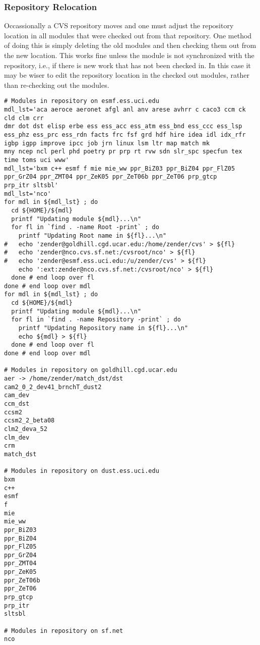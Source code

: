 \documentclass[12pt,twoside]{article}
\begin{document}
\subsubsection{Repository Relocation}\label{sxn:rlc}
Occassionally a CVS repository moves and one must adjust the
 repository location in all modules that were checked out from that
 repository. 
One method of doing this is simply deleting the old modules and then
 checking them out from the new location.
This works fine unless the module is not synchronized with the
 repository, i.e., if there is new work that has not been checked in. 
In this case it may be wiser to edit the repository location in the 
checked out modules, rather than re-checking out the modules.
\begin{verbatim}
# Modules in repository on esmf.ess.uci.edu 
mdl_lst='aca aeroce aeronet afgl anl anv arese avhrr c caco3 ccm ck cld clm crr
dmr dot dst elisp erbe ess ess_acc ess_atm ess_bnd ess_ccc ess_lsp
ess_phz ess_prc ess_rdn facts frc fsf grd hdf hire idea idl idx_rfr
igbp igpp improve ipcc job jrn linux lsm ltr map match mk
mny ncep ncl perl phd poetry pr prp rt rvw sdn slr_spc specfun tex
time toms uci www' 
mdl_lst='bxm c++ esmf f mie mie_ww ppr_BiZ03 ppr_BiZ04 ppr_FlZ05
ppr_GrZ04 ppr_ZMT04 ppr_ZeK05 ppr_ZeT06b ppr_ZeT06 prp_gtcp
prp_itr sltsbl'
mdl_lst='nco'
for mdl in ${mdl_lst} ; do
  cd ${HOME}/${mdl}
  printf "Updating module ${mdl}...\n"
  for fl in `find . -name Root -print` ; do
    printf "Updating Root name in ${fl}...\n"
#   echo 'zender@goldhill.cgd.ucar.edu:/home/zender/cvs' > ${fl}
#   echo 'zender@nco.cvs.sf.net:/cvsroot/nco' > ${fl}
#   echo 'zender@esmf.ess.uci.edu:/u/zender/cvs' > ${fl}
    echo ':ext:zender@nco.cvs.sf.net:/cvsroot/nco' > ${fl}
  done # end loop over fl
done # end loop over mdl
for mdl in ${mdl_lst} ; do
  cd ${HOME}/${mdl}
  printf "Updating module ${mdl}...\n"
  for fl in `find . -name Repository -print` ; do
    printf "Updating Repository name in ${fl}...\n"
    echo ${mdl} > ${fl}
  done # end loop over fl
done # end loop over mdl

# Modules in repository on goldhill.cgd.ucar.edu
aer -> /home/zender/match_dst/dst
cam2_0_2_dev41_brnchT_dust2
cam_dev
ccm_dst
ccsm2
ccsm2_2_beta08
clm2_deva_52
clm_dev
crm
match_dst

# Modules in repository on dust.ess.uci.edu
bxm
c++
esmf
f
mie
mie_ww
ppr_BiZ03
ppr_BiZ04
ppr_FlZ05
ppr_GrZ04
ppr_ZMT04
ppr_ZeK05
ppr_ZeT06b
ppr_ZeT06
prp_gtcp
prp_itr
sltsbl

# Modules in repository on sf.net
nco
\end{verbatim}
\end{document}
